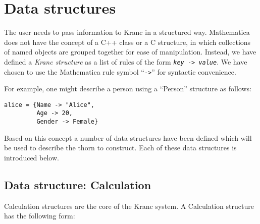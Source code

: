 \documentclass{report}
\begin{document}
\section{Data structures}

The user needs to pass information to Kranc in a structured way.
Mathematica does not have the concept of a C++ class or a C structure,
in which collections of named objects are grouped together for ease of
manipulation.  Instead, we have defined a {\em Kranc structure} as a
list of rules of the form {\tt {\it key} -> {\it value}}.  We have
chosen to use the Mathematica rule symbol ``{\tt ->}'' for syntactic
convenience.

For example, one might describe a person using a ``Person'' structure
as follows:

\begin{center}
\begin{minipage}{0.8 \textwidth}
\begin{verbatim}
alice = {Name -> "Alice",
         Age -> 20,
         Gender -> Female}
\end{verbatim}
\end{minipage}
\end{center}

Based on this concept a number of data structures have been defined
which will be used to describe the thorn to construct.  Each of these
data structures is introduced below.


\subsection{Data structure: Calculation}

Calculation structures are the core of the Kranc system.  A Calculation
structure has the following form:
\end{document}
